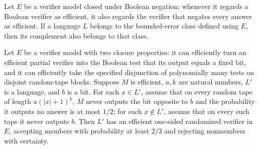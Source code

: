 \begin{theorem}
\label{Randomized.InBPP.compl}
\leanok
{}
Let $E$ be a verifier model closed under Boolean negation: whenever it regards a Boolean
verifier as efficient, it also regards the verifier that negates every answer as
efficient. If a language $L$ belongs to the bounded-error class defined using $E$, then
its complement also belongs to that class.
\end{theorem}

\begin{theorem}
\label{Randomized.inRP_of_zeroError}
\leanok
{}
Let $E$ be a verifier model with two closure properties: it can efficiently turn an
efficient partial verifier into the Boolean test that its output equals a fixed bit, and
it can efficiently take the specified disjunction of polynomially many tests on disjoint
random-tape blocks. Suppose $M$ is efficient, $a,k$ are natural numbers, $L'$ is a
language, and $b$ is a bit. For each $x\in L'$, assume that on every random tape of
length $a(|x|+1)^k$, $M$ never outputs the bit opposite to $b$ and the probability it
outputs no answer is at most $1/2$; for each $x\notin L'$, assume that on every such
tape it never outputs $b$. Then $L'$ has an efficient one-sided randomized verifier in
$E$, accepting members with probability at least $2/3$ and rejecting nonmembers with
certainty.
\end{theorem}

